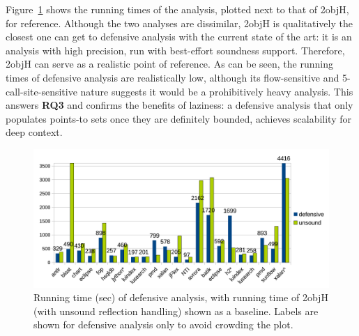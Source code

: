 
Figure~\ref{fig:sound:time} shows the running times of the analysis, plotted next to that of 2objH, for reference. Although the two analyses are dissimilar, 2objH is qualitatively the closest one can get to defensive analysis with the current state of the art: it is an analysis with high precision, run with best-effort soundness support. Therefore, 2objH can serve as a realistic point of reference. As can be seen, the running times of defensive analysis are realistically low, although its flow-sensitive and 5-call-site-sensitive nature suggests it would be a prohibitively heavy analysis. This answers \textbf{RQ3} and confirms the benefits of laziness: a defensive analysis that only populates points-to sets once they are definitely bounded, achieves scalability for deep context.

\begin{figure}[tbh]
\centering
\includegraphics[width=\linewidth]{assets/defensive/time.pdf}
\caption{Running time (sec) of defensive analysis, with running time of 2objH (with unsound reflection handling) shown as a baseline. Labels are shown for defensive analysis only to avoid crowding the plot.}
\label{fig:sound:time}
\end{figure}


